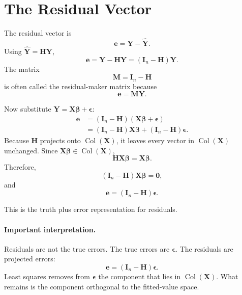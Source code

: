 \section{The Residual Vector}

The residual vector is
\begin{equation}
  \mathbf{e}=\mathbf{Y}-\widehat{\mathbf{Y}}.
\end{equation}
Using \(\widehat{\mathbf{Y}}=\mathbf{H}\mathbf{Y}\),
\begin{equation}
  \mathbf{e}=\mathbf{Y}-\mathbf{H}\mathbf{Y}=(\mathbf{I}_n-\mathbf{H})\mathbf{Y}.
\end{equation}
The matrix
\begin{equation}
  \mathbf{M}=\mathbf{I}_n-\mathbf{H}
\end{equation}
is often called the residual-maker matrix because
\begin{equation}
  \mathbf{e}=\mathbf{M}\mathbf{Y}.
\end{equation}

Now substitute \(\mathbf{Y}=\mathbf{X}\boldsymbol{\beta}+\boldsymbol{\epsilon}\):
\begin{align}
  \mathbf{e}
  &=(\mathbf{I}_n-\mathbf{H})(\mathbf{X}\boldsymbol{\beta}+\boldsymbol{\epsilon}) \\
  &=(\mathbf{I}_n-\mathbf{H})\mathbf{X}\boldsymbol{\beta}
  +(\mathbf{I}_n-\mathbf{H})\boldsymbol{\epsilon}.
\end{align}
Because \(\mathbf{H}\) projects onto \(\operatorname{Col}(\mathbf{X})\), it leaves every vector in \(\operatorname{Col}(\mathbf{X})\) unchanged.  Since \(\mathbf{X}\boldsymbol{\beta}\in\operatorname{Col}(\mathbf{X})\),
\begin{equation}
  \mathbf{H}\mathbf{X}\boldsymbol{\beta}=\mathbf{X}\boldsymbol{\beta}.
\end{equation}
Therefore,
\begin{equation}
  (\mathbf{I}_n-\mathbf{H})\mathbf{X}\boldsymbol{\beta}=\mathbf{0},
\end{equation}
and
\begin{equation}
  \boxed{
  \mathbf{e}=(\mathbf{I}_n-\mathbf{H})\boldsymbol{\epsilon}.
  }
  \label{eq:ch10-residual-truth-error}
\end{equation}

This is the truth plus error representation for residuals.

\paragraph{Important interpretation.}
Residuals are not the true errors.  The true errors are \(\boldsymbol{\epsilon}\).  The residuals are projected errors:
\begin{equation}
  \mathbf{e}=(\mathbf{I}_n-\mathbf{H})\boldsymbol{\epsilon}.
\end{equation}
Least squares removes from \(\boldsymbol{\epsilon}\) the component that lies in \(\operatorname{Col}(\mathbf{X})\).  What remains is the component orthogonal to the fitted-value space.

